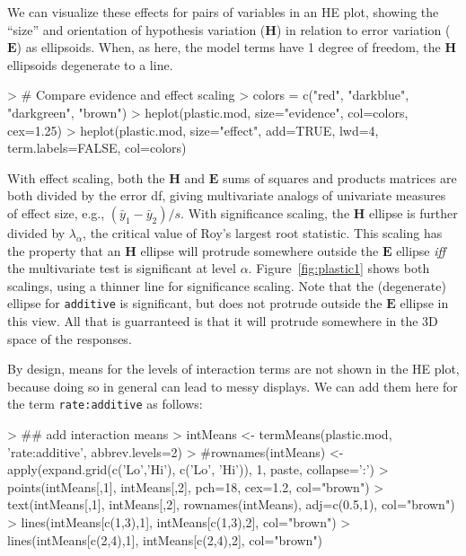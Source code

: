 \documentclass[11pt]{article}
\newcommand{\mat}[1]{\ensuremath{\bm{#1}}}
\newcommand{\figref}[1]{Figure~\ref{#1}}
\newcommand{\code}[1]{{\texttt{#1}}}
\begin{document}
We can visualize these
effects for pairs of variables in an HE plot, showing the ``size'' and
orientation of hypothesis variation (\mat{H}) in relation to error
variation (\mat{E}) as ellipsoids.
When, as here, the model terms have 1 degree of freedom, the
\mat{H} ellipsoids degenerate to a line.
\begin{Schunk}
\begin{Sinput}
> # Compare evidence and effect scaling 
> colors = c("red", "darkblue", "darkgreen", "brown")
> heplot(plastic.mod, size="evidence", col=colors, cex=1.25)
> heplot(plastic.mod, size="effect", add=TRUE, lwd=4, term.labels=FALSE, col=colors)
\end{Sinput}
\end{Schunk}
With effect scaling, both the \mat{H} and \mat{E} sums of squares and products
matrices are both divided by the error df, giving multivariate analogs of univariate
measures of effect size, e.g., $(\bar{y}_1-\bar{y}_2) / s$.
With significance scaling, the \mat{H} ellipse is further divided by
$\lambda_\alpha$, the critical value of Roy's largest root statistic.
This scaling has the property that an \mat{H} ellipse will protrude somewhere
outside the \mat{E} ellipse \emph{iff} the
multivariate test is significant at level $\alpha$.
\figref{fig:plastic1} shows both scalings, using a thinner line for significance scaling.
Note that the (degenerate) ellipse for \code{additive} is significant, but
does not protrude outside the \mat{E} ellipse in this view.
All that is guarranteed is that it will protrude somewhere in the 3D space of
the responses.


By design, means for the levels of interaction terms are not shown in the HE plot,
because doing so in general can lead to messy displays.
We can add them here for the term \code{rate:additive} as follows:
\begin{Schunk}
\begin{Sinput}
> ## add interaction means
> intMeans <- termMeans(plastic.mod, 'rate:additive', abbrev.levels=2)
> #rownames(intMeans) <- apply(expand.grid(c('Lo','Hi'), c('Lo', 'Hi')), 1, paste, collapse=':')
> points(intMeans[,1], intMeans[,2], pch=18, cex=1.2, col="brown")
> text(intMeans[,1], intMeans[,2], rownames(intMeans), adj=c(0.5,1), col="brown")
> lines(intMeans[c(1,3),1], intMeans[c(1,3),2], col="brown")
> lines(intMeans[c(2,4),1], intMeans[c(2,4),2], col="brown")
\end{Sinput}
\end{Schunk}
\end{document}
